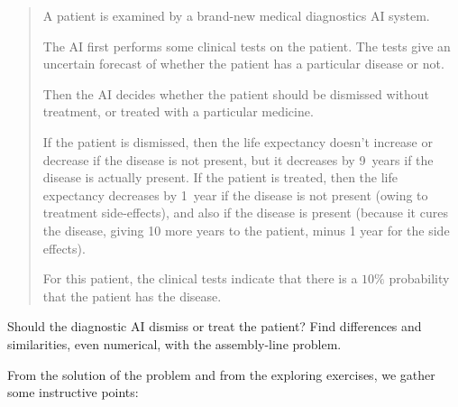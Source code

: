 \documentclass[
  a4paper,
  DIV=11,
  numbers=noendperiod,
  oneside]{scrreprt}
\begin{document}
\begin{tcolorbox}
\begin{enumerate}
  \begin{quote}
  A patient is examined by a brand-new medical diagnostics AI system.

  The AI first performs some clinical tests on the patient. The tests
  give an uncertain forecast of whether the patient has a particular
  disease or not.

  Then the AI decides whether the patient should be dismissed without
  treatment, or treated with a particular medicine.

  If the patient is dismissed, then the life expectancy doesn't increase
  or decrease if the disease is not present, but it decreases by 9~years
  if the disease is actually present. If the patient is treated, then
  the life expectancy decreases by 1~year if the disease is not present
  (owing to treatment side-effects), and also if the disease is present
  (because it cures the disease, giving 10 more years to the patient,
  minus 1 year for the side effects).

  For this patient, the clinical tests indicate that there is a \(10\%\)
  probability that the patient has the disease.
  \end{quote}

  Should the diagnostic AI dismiss or treat the patient? Find
  differences and similarities, even numerical, with the assembly-line
  problem.
\end{enumerate}

\end{tcolorbox}

\hfill\break

From the solution of the problem and from the exploring exercises, we
gather some instructive points:
\end{document}
